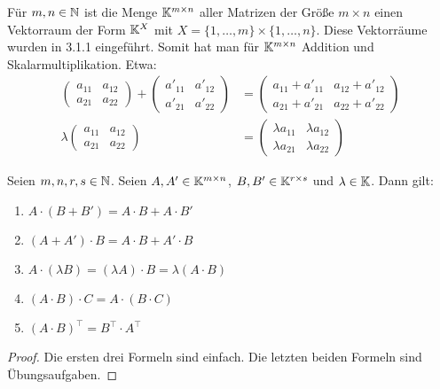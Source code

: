 Für $ m,n\in\mathbb N $ ist die Menge $ \mathbb K^{m \times n} $ aller Matrizen der Größe $ m \times n $ einen Vektorraum der Form $ \mathbb K^X $ mit $ X = \{ 1,\ldots,m \}\times\{ 1,\ldots,n \} $. Diese Vektorräume wurden in 3.1.1 eingeführt. Somit hat man für $ \mathbb K^{m \times n} $ Addition und Skalarmultiplikation. Etwa:
\begin{align}
	\left( \begin{matrix}
	a_{11} & a_{12} \\ 
	a_{21} & a_{22}
	\end{matrix} \right)
	+
	\left( \begin{matrix}
	a'_{11} & a'_{12} \\ 
	a'_{21} & a'_{22}
	\end{matrix} \right)
	&=
	\left( \begin{matrix}
	a_{11}+a'_{11} & a_{12}+a'_{12} \\ 
	a_{21}+a'_{21} & a_{22}+a'_{22}
	\end{matrix} \right)\\
	\lambda
	\left( \begin{matrix}
	a_{11} & a_{12} \\ 
	a_{21} & a_{22}
	\end{matrix} \right)
	&=
	\left( \begin{matrix}
	\lambda a_{11} & \lambda a_{12} \\ 
	\lambda a_{21} & \lambda a_{22}
	\end{matrix} \right)
\end{align}

\begin{thm}
	Seien $ m,n,r,s\in\mathbb N $. Seien $ A,A'\in\mathbb K^{m \times n} $, $ B,B'\in\mathbb K^{r \times s} $ und $ \lambda\in\mathbb K $. Dann gilt:
	\begin{enumerate}[label=\normalfont(\roman*)]
		\item $ A \cdot ( B + B') = A \cdot B + A \cdot B' $
		\item $ (A + A') \cdot B = A \cdot B + A' \cdot B $
		\item $ A \cdot (\lambda B) = (\lambda A) \cdot B = \lambda (A \cdot B) $
		\item $ (A \cdot B) \cdot C = A \cdot (B \cdot C) $
		\item $ (A \cdot B)^\top = B^\top \cdot A^\top $
	\end{enumerate}
\end{thm}
\begin{proof}
	Die ersten drei Formeln sind einfach. Die letzten beiden Formeln sind Übungsaufgaben.
\end{proof}

